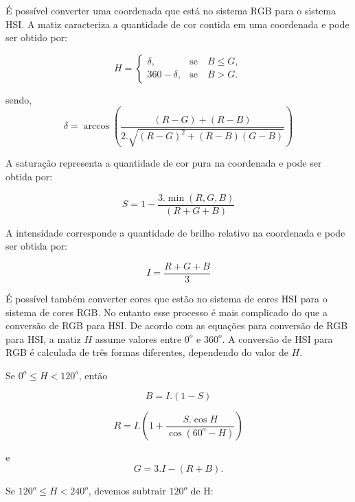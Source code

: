 \documentclass[	12pt, Times, openright, twoside, a4paper, english, brazil]{abntex2}
\begin{document}
É possível converter uma coordenada que está no sistema RGB para o sistema HSI. A matiz caracteriza a quantidade de cor contida em uma coordenada e pode ser obtido por:

\begin{equation}
H=\left\{\begin{array}{rc}
\delta,&\mbox{se}\quad B\leq G,\\
360 - \delta, &\mbox{se}\quad B>G.
\end{array}\right.
\end{equation}

sendo,
\begin{equation}
\delta = \arccos \left( \frac{(R - G) + (R - B)}{2  .  \sqrt{(R-G)^2 + (R-B)(G-B)} } \right)
\end{equation}
 
A saturação representa a quantidade de cor pura na coordenada e pode ser obtida por: 

\begin{equation}
S = 1 -  \frac{3 . \min(R, G, B)}{(R+G+B)} 
\end{equation}

A intensidade corresponde a quantidade de brilho relativo na coordenada e pode ser obtida por:

\begin{equation}
I = \frac{R+G+B}{3}
\end{equation}

É possível também converter cores que estão no sistema de cores HSI para o sistema de cores RGB. No entanto esse processo é mais complicado do que a conversão de RGB para HSI. De acordo com as equações para conversão de RGB para HSI, a matiz $H$ assume valores entre $0^o$ e $360^o$. A conversão de HSI para RGB é calculada de três formas diferentes, dependendo do valor de $H$. 

Se $0^o \leq H < 120^o$, então

\begin{equation}
B=I . (1-S)
\end{equation}

\begin{equation}
R=I  . \left( 1 +  \frac{S . \cos{H}}{\cos{(60^o - H)}} \right)
\end{equation}

 e
\begin{equation}
G=3 . I - (R+B).
\end{equation}

Se $120^o \leq H < 240^o$, devemos subtrair $120^o$ de H:
\end{document}
